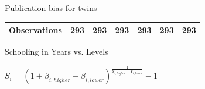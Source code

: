\documentclass{beamer} %
\begin{document}
\begin{frame}{Publication bias for twins}
\begin{tiny}
\begin{table}[!htbp]
\begin{tabular}{
                    @{}
                    l*{6}{c}}
                \midrule
                \addlinespace[0.5em]
                Observations                          & 293     & 293     & 293     & 293     & 293     & 293     \\

                \bottomrule
            \end{tabular}
        \end{table}

    \end{tiny}
\end{frame}

\begin{frame}{Schooling in Years vs. Levels}
    \begin{center}

        \begin{Large}
            $
                S_i = \left(1 + \beta_{i, higher} - \beta_{i, lower}\right)^{\frac{1}{Y_{i, higher} - Y_{i, lower}}} - 1
            $
        \end{Large}


    \end{center}
\end{frame}
\end{document}
